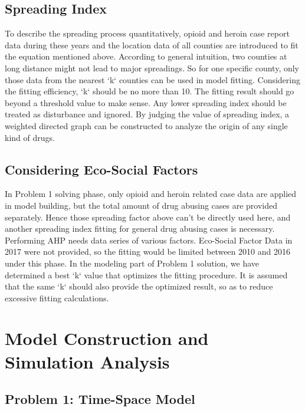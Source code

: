 \documentclass{mcmthesis}
\begin{document}
\subsection{Spreading Index}
To describe the spreading process quantitatively, opioid and heroin case report data during these years and the location data of all counties are introduced to fit the equation mentioned above. According to general intuition, two counties at long distance might not lead to major spreadings. So for one specific county, only those data from the nearest `k` counties can be used in model fitting. Considering the fitting efficiency, `k` should be no more than 10. The fitting result should go beyond a threshold value to make sense. Any lower spreading index should be treated as disturbance and ignored. By judging the value of spreading index, a weighted directed graph can be constructed to analyze the origin of any single kind of drugs.

\subsection{Considering Eco-Social Factors}
In Problem 1 solving phase, only opioid and heroin related case data are applied in model building, but the total amount of drug abusing cases are provided separately. Hence those spreading factor above can’t be directly used here, and another spreading index fitting for general drug abusing cases is necessary.
Performing AHP needs data series of various factors. Eco-Social Factor Data in 2017 were not provided, so the fitting would be limited between 2010 and 2016 under this phase.
In the modeling part of Problem 1 solution, we have determined a best `k` value that optimizes the fitting procedure. It is assumed that the same `k` should also provide the optimized result, so as to reduce excessive fitting calculations.


\section{Model Construction and Simulation Analysis}
\subsection{Problem 1: Time-Space Model}
\end{document}
